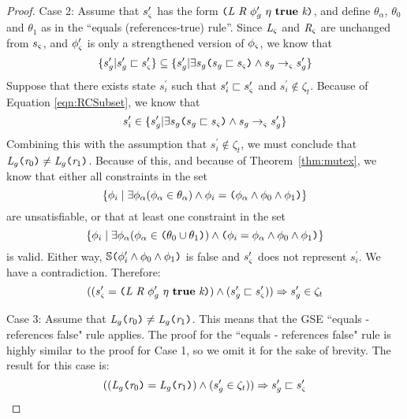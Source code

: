 \begin{proof}
Case 2:  Assume that $s_{\varsigma}^\prime$ has the form $\lp \cfgnt{L}\ \cfgnt{R}\ \phi_g^\prime\ \eta\ \cfgt{true}\ \cfgnt{k}\rp $, and define $\theta_\alpha$, $\theta_0$ and $\theta_1$ as in the ``equals (references-true) rule''. Since $\emph{L}_{\varsigma}$ and $\emph{R}_{\varsigma}$ are unchanged from $s_{\varsigma}$, and $\phi_{\varsigma}^\prime$ is only a strengthened version of $\phi_{\varsigma}$,  we know that
\begin{equation}
\label{eqn:RCSubset}
\{s_{g}^\prime | s_{g}^\prime \sqsubset s_{\varsigma}^\prime \} \subseteq \{s_{g}^\prime | \exists s_{g} \texttt{(} s_{g} \sqsubset s_{\varsigma} \texttt{)} \wedge s_{g} \rightarrow_{\varsigma} s_{g}^\prime\}
\end{equation}
Suppose that there exists state $s_i^\prime$ such that $s_i^\prime \sqsubset s_{\varsigma}^\prime$ and $s_i^\prime \notin \zeta_t$. Because of Equation \ref{eqn:RCSubset}, we know that 
$$s_i^\prime \in \{s_{g}^\prime | \exists s_{g} \texttt{(} s_{g} \sqsubset s_{\varsigma}\texttt{)} \wedge s_{g} \rightarrow_{\varsigma} s_{g}^\prime\}$$ 
Combining this with the assumption that $s_i^\prime \notin \zeta_t$, we must conclude that $\emph{L}_{g} \texttt{(} \emph{r}_0\texttt{)} \neq  \emph{L}_{g} \texttt{(} \emph{r}_1 \texttt{)}$. Because of this, and because of Theorem~\ref{thm:mutex}, we know that either all constraints in the set
$$\{\phi_i \mid \exists \phi_\alpha (\phi_\alpha \in \theta_\alpha)\wedge \phi_i = \texttt{(}\phi_\alpha \wedge \phi_0 \wedge \phi_1\texttt{)}\}$$ are unsatisfiable, or that at least one constraint in the set
$$\{\phi_i \mid \exists \phi_\alpha (\phi_\alpha \in \texttt{(} \theta_0 \cup \theta_1 \texttt{)})\wedge \texttt{(} \phi_i = \phi_\alpha \wedge \phi_0 \wedge \phi_1 \texttt{)}\}$$ 
is valid. Either way, $\mathbb{S}\texttt{(}\phi_i^\prime \wedge\phi_0\wedge \phi_1\texttt{)}$ is false and $s_{\varsigma}^\prime$ does not represent $s_i^\prime$. We have a contradiction. Therefore: 
\begin{equation}
\label{eqn:RCBackwardsTrue}
((s_\sym^\prime=\lp \cfgnt{L}\ \cfgnt{R}\ \phi_g^\prime\ \eta\ \cfgt{true}\ \cfgnt{k}\rp) \wedge (s_\gse^\prime \sqsubset s_\sym^\prime)) \Rightarrow s_\gse^\prime \in \zeta_t
\end{equation}

Case 3: Assume that $\emph{L}_{g} \texttt{(} \emph{r}_0\texttt{)} \neq \emph{L}_{g} \texttt{(} \emph{r}_1 \texttt{)}$.
This means that the GSE ``equals - references false" rule applies. The proof for the ``equals - references false" rule is highly similar to the proof for Case 1, so we omit it for the sake of brevity. The result for this case is:
\begin{equation}
\label{eqn:RCForwardsFalse}
((\emph{L}_{g} \texttt{(} \emph{r}_0\texttt{)} = \emph{L}_{g} \texttt{(} \emph{r}_1 \texttt{)}) \wedge (s_{g}^\prime \in \zeta_t)) \Rightarrow s_{g}^\prime \sqsubset s_{\varsigma}^\prime
\end{equation}


\end{proof}
